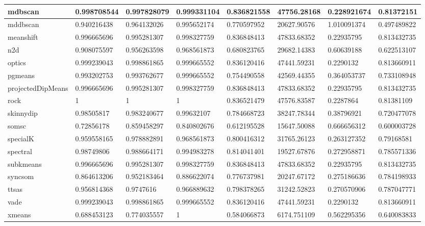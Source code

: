 \begin{table}[H]
\begin{tabular}{|l|l|l|l|l|l|l|l|}
\hline
mdbscan & 0.998708544 & 0.997828079 & 0.999331104 & 0.836821558 & 47756.28168 & 0.228921674 & 0.81372151 \\
\hline
mddbscan & 0.940216438 & 0.964132026 & 0.995652174 & 0.770597952 & 20627.90576 & 1.010091374 & 0.497489822 \\
\hline
meanshift & 0.996665696 & 0.995281307 & 0.998327759 & 0.836848413 & 47833.68352 & 0.22935795 & 0.813432735 \\
\hline
n2d & 0.908075597 & 0.956263598 & 0.968561873 & 0.680823765 & 29682.14383 & 0.60639188 & 0.622513107 \\
\hline
optics & 0.999239043 & 0.998861865 & 0.999665552 & 0.836120416 & 47441.59231 & 0.2290132 & 0.813660911 \\
\hline
pgmeans & 0.993202753 & 0.993762677 & 0.999665552 & 0.754490558 & 42569.44355 & 0.364053737 & 0.733108948 \\
\hline
projectedDipMeans & 0.996665696 & 0.995281307 & 0.998327759 & 0.836848413 & 47833.68352 & 0.22935795 & 0.813432735 \\
\hline
rock & 1 & 1 & 1 & 0.836521479 & 47576.83587 & 0.2287864 & 0.81381109 \\
\hline
skinnydip & 0.98505817 & 0.983240677 & 0.99632107 & 0.784668723 & 38247.78344 & 0.38796921 & 0.720477078 \\
\hline
somsc & 0.72856178 & 0.859458297 & 0.840802676 & 0.612195528 & 15647.50088 & 0.666656312 & 0.600003728 \\
\hline
specialK & 0.959558165 & 0.978882891 & 0.968561873 & 0.800416312 & 31765.26123 & 0.263127352 & 0.79168581 \\
\hline
spectral & 0.98749806 & 0.988664171 & 0.994983278 & 0.814041401 & 19527.67876 & 0.272958871 & 0.785571336 \\
\hline
subkmeans & 0.996665696 & 0.995281307 & 0.998327759 & 0.836848413 & 47833.68352 & 0.22935795 & 0.813432735 \\
\hline
syncsom & 0.864613206 & 0.952183464 & 0.886622074 & 0.776737981 & 20247.67172 & 0.275186636 & 0.784198933 \\
\hline
ttsas & 0.956814368 & 0.9747616 & 0.966889632 & 0.798378265 & 31242.52823 & 0.270570906 & 0.787047771 \\
\hline
vade & 0.999239043 & 0.998861865 & 0.999665552 & 0.836120416 & 47441.59231 & 0.2290132 & 0.813660911 \\
\hline
xmeans & 0.688453123 & 0.774035557 & 1 & 0.584066873 & 6174.751109 & 0.562295356 & 0.640083833 \\
\hline
\end{tabular}
\end{table}

